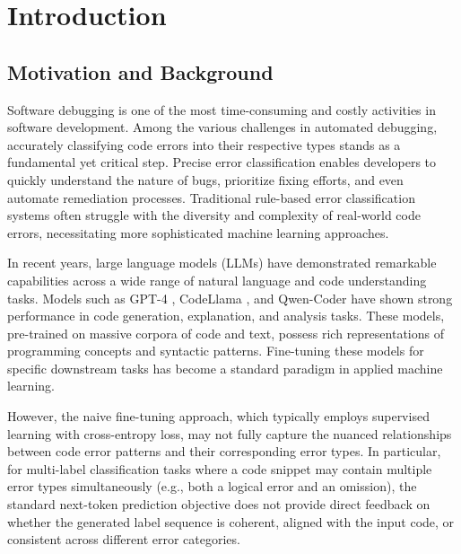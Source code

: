 \chapter{Introduction}
\begingroup
\justifying
\setlength{\parindent}{0pt}
\setlength{\parskip}{0.5\baselineskip}
\titlespacing{\chapter}{0pt}{0pt}{0pt}
\titlespacing{\section}{0pt}{0pt}{0pt}

\section{Motivation and Background}

Software debugging is one of the most time-consuming and costly activities in software development. Among the various challenges in automated debugging, accurately classifying code errors into their respective types stands as a fundamental yet critical step. Precise error classification enables developers to quickly understand the nature of bugs, prioritize fixing efforts, and even automate remediation processes. Traditional rule-based error classification systems often struggle with the diversity and complexity of real-world code errors, necessitating more sophisticated machine learning approaches.

In recent years, large language models (LLMs) have demonstrated remarkable capabilities across a wide range of natural language and code understanding tasks. Models such as GPT-4 \cite{openai2023gpt4}, CodeLlama \cite{roziere2023code}, and Qwen-Coder \cite{qwen2024coder} have shown strong performance in code generation, explanation, and analysis tasks. These models, pre-trained on massive corpora of code and text, possess rich representations of programming concepts and syntactic patterns. Fine-tuning these models for specific downstream tasks has become a standard paradigm in applied machine learning.

However, the naive fine-tuning approach, which typically employs supervised learning with cross-entropy loss, may not fully capture the nuanced relationships between code error patterns and their corresponding error types. In particular, for multi-label classification tasks where a code snippet may contain multiple error types simultaneously (e.g., both a logical error and an omission), the standard next-token prediction objective does not provide direct feedback on whether the generated label sequence is coherent, aligned with the input code, or consistent across different error categories.

